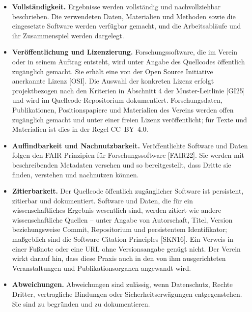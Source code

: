 \documentclass[a4paper, fontsize=11pt]{scrartcl}
\begin{document}
\begin{itemize}
  \item \textbf{Vollständigkeit.} Ergebnisse werden vollständig und nachvollziehbar beschrieben. Die verwendeten Daten, Materialien und Methoden sowie die eingesetzte Software werden verfügbar gemacht, und die Arbeitsabläufe und ihr Zusammenspiel werden dargelegt.
  \item \textbf{Veröffentlichung und Lizenzierung.} Forschungssoftware, die im Verein oder in seinem Auftrag entsteht, wird unter Angabe des Quellcodes öffentlich zugänglich gemacht. Sie erhält eine von der Open Source Initiative anerkannte Lizenz [OSI]. Die Auswahl der konkreten Lizenz erfolgt projektbezogen nach den Kriterien in Abschnitt 4 der Muster-Leitlinie [GI25] und wird im Quellcode-Repositorium dokumentiert. Forschungsdaten, Publikationen, Positionspapiere und Materialien des Vereins werden offen zugänglich gemacht und unter einer freien Lizenz veröffentlicht; für Texte und Materialien ist dies in der Regel CC~BY~4.0.
  \item \textbf{Auffindbarkeit und Nachnutzbarkeit.} Veröffentlichte Software und Daten folgen den FAIR-Prinzipien für Forschungssoftware [FAIR22]. Sie werden mit beschreibenden Metadaten versehen und so bereitgestellt, dass Dritte sie finden, verstehen und nachnutzen können.
  \item \textbf{Zitierbarkeit.} Der Quellcode öffentlich zugänglicher Software ist persistent, zitierbar und dokumentiert. Software und Daten, die für ein wissenschaftliches Ergebnis wesentlich sind, werden zitiert wie andere wissenschaftliche Quellen -- unter Angabe von Autorschaft, Titel, Version beziehungsweise Commit, Repositorium und persistentem Identifikator; maßgeblich sind die Software Citation Principles [SKN16]. Ein Verweis in einer Fußnote oder eine URL ohne Versionsangabe genügt nicht. Der Verein wirkt darauf hin, dass diese Praxis auch in den von ihm ausgerichteten Veranstaltungen und Publikationsorganen angewandt wird.
  \item \textbf{Abweichungen.} Abweichungen sind zulässig, wenn Datenschutz, Rechte Dritter, vertragliche Bindungen oder Sicherheitserwägungen entgegenstehen. Sie sind zu begründen und zu dokumentieren.
\end{itemize}
\end{document}
